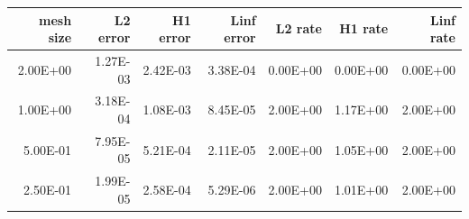 \begin{tabular}{rrrrrrr}
\toprule
mesh size & L2 error & H1 error & Linf error & L2 rate & H1 rate & Linf rate \\
\midrule
2.00E+00 & 1.27E-03 & 2.42E-03 & 3.38E-04 & 0.00E+00 & 0.00E+00 & 0.00E+00 \\
1.00E+00 & 3.18E-04 & 1.08E-03 & 8.45E-05 & 2.00E+00 & 1.17E+00 & 2.00E+00 \\
5.00E-01 & 7.95E-05 & 5.21E-04 & 2.11E-05 & 2.00E+00 & 1.05E+00 & 2.00E+00 \\
2.50E-01 & 1.99E-05 & 2.58E-04 & 5.29E-06 & 2.00E+00 & 1.01E+00 & 2.00E+00 \\
\bottomrule
\end{tabular}

